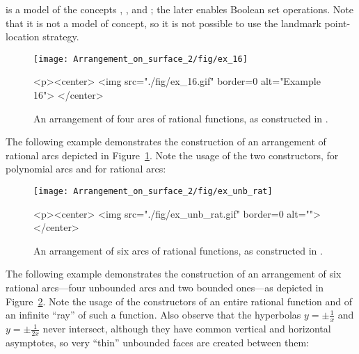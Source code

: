  is a model
of the concepts ,
, and
; the later enables
Boolean set operations. Note that it is not a model of
 concept, so it is not possible to
use the landmark point-location strategy.

\begin{figure}[h]
\begin{ccTexOnly} 
  \begin{center}
  \texttt{[image: Arrangement\_on\_surface\_2/fig/ex\_16]}
  \end{center}
\end{ccTexOnly}
\begin{ccHtmlOnly}
  <p><center>
  <img src="./fig/ex_16.gif" border=0 alt="Example 16">
  </center>
\end{ccHtmlOnly}
\caption{An arrangement of four arcs of rational functions, as
constructed in .\label{arr_fig:ex_16}}
\end{figure}

The following example demonstrates the construction of an
arrangement of rational arcs depicted in
Figure~\ref{arr_fig:ex_16}. Note the usage of the two
constructors, for polynomial arcs and for rational arcs:

\pagebreak[3]


\begin{figure}[h]
\begin{ccTexOnly}
  \begin{center}
  \texttt{[image: Arrangement\_on\_surface\_2/fig/ex\_unb\_rat]}
  \end{center}
\end{ccTexOnly}
\begin{ccHtmlOnly}
  <p><center>
  <img src="./fig/ex_unb_rat.gif" border=0 alt="">
  </center>
\end{ccHtmlOnly}
\caption{An arrangement of six arcs of rational functions, as
constructed in
.\label{arr_fig:ex_unb_rat}}
\end{figure}

The following example demonstrates the construction of an
arrangement of six rational arcs---four unbounded arcs and two
bounded ones---as depicted in Figure~\ref{arr_fig:ex_unb_rat}. Note
the usage of the constructors of an entire rational function and of
an infinite ``ray'' of such a function. Also observe that the hyperbolas
$y = \pm\frac{1}{x}$ and $y = \pm\frac{1}{2x}$ never intersect, although
they have common vertical and horizontal asymptotes, so very ``thin''
unbounded faces are created between them:

